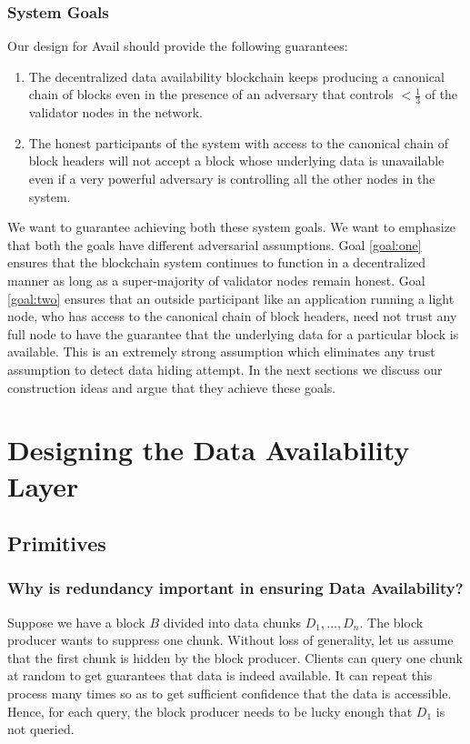 \documentclass[sigconf, screen=true, nonacm]{acmart}
\begin{document}
        \subsubsection{System Goals}\label{goals}
            Our design for Avail should provide the following guarantees:
            \begin{enumerate}
                \item \label{goal:one} The decentralized data availability blockchain keeps producing a canonical chain of blocks even in the presence of an adversary that controls $<\!\!\frac{1}{3}$ of the validator nodes in the network. 
                \item \label{goal:two} The honest participants of the system with access to the canonical chain of block headers will not accept a block whose underlying data is unavailable even if a very powerful adversary is controlling all the other nodes in the system.
            \end{enumerate}
            We want to guarantee achieving both these system goals. We want to emphasize that both the goals have different adversarial assumptions. Goal \ref{goal:one} ensures that the blockchain system continues to function in a decentralized manner as long as a super-majority of validator nodes remain honest. Goal \ref{goal:two} ensures that an outside participant like an application running a light node, who has access to the canonical chain of block headers, need not trust any full node to have the guarantee that the underlying data for a particular block is available. This is an extremely strong assumption which eliminates any trust assumption to detect data hiding attempt. In the next sections we discuss our construction ideas and argue that they achieve these goals. 

\section{Designing the Data Availability Layer}
    \subsection{Primitives}
        \subsubsection{Why is redundancy important in ensuring Data Availability?}
            Suppose we have a block $B$ divided into data chunks $D_1, \dots, D_n$. The block producer wants to suppress one chunk. Without loss of generality, let us assume that the first chunk is hidden by the block producer. Clients can query one chunk at random to get guarantees that data is indeed available. It can repeat this process many times so as to get sufficient confidence that the data is accessible. Hence, for each query, the block producer needs to be lucky enough that $D_1$ is not queried.
\end{document}
